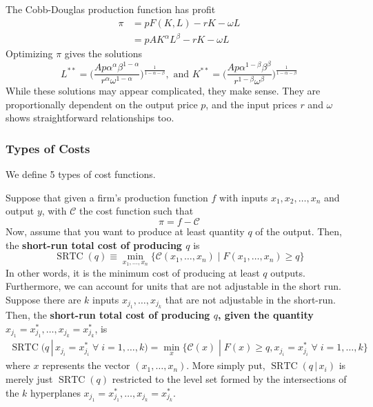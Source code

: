 \documentclass{article}
\DeclareMathOperator{\SRTC}{SRTC}
\begin{document}
      \begin{example}
        The Cobb-Douglas production function has profit
        \begin{align*}
            \pi & = p F(K, L) - r K - \omega L \\
            & = p A K^\alpha L^\beta - r K - \omega L
        \end{align*}
        Optimizing $\pi$ gives the solutions 
        \[L^{**} = \Bigg(\frac{A p \alpha^\alpha \beta^{1-\alpha}}{r^\alpha \omega^{1-\alpha}} \Bigg)^{\frac{1}{1-\alpha-\beta}}, \text{ and } K^{**} = \Bigg(\frac{A p \alpha^{1-\beta} \beta^\beta}{r^{1-\beta} \omega^\beta}\Bigg)^{\frac{1}{1-\alpha-\beta}} \]
        While these solutions may appear complicated, they make sense. They are proportionally dependent on the output price $p$, and the input prices $r$ and $\omega$ shows straightforward relationships too. 
      \end{example}

    \subsubsection{Types of Costs}

      We define 5 types of cost functions. 

      \begin{definition}
        Suppose that given a firm's production function $f$ with inputs $x_1, x_2, \ldots, x_n$ and output $y$, with $\mathcal{C}$ the cost function such that
        \[\pi = f - \mathcal{C}\]
        Now, assume that you want to produce at least quantity $q$ of the output. Then, the \textbf{short-run total cost of producing $q$} is
        \[\SRTC(q) \equiv \min_{x_1, \ldots, x_n} \{ \mathcal{C}(x_1, \ldots, x_n) \;|\; F(x_1, \ldots, x_n) \geq q\}\]
        In other words, it is the minimum cost of producing at least $q$ outputs. Furthermore, we can account for units that are not adjustable in the short run. Suppose there are $k$ inputs $x_{j_1}, \ldots, x_{j_k}$ that are not adjustable in the short-run. Then, the \textbf{short-run total cost of producing $q$, given the quantity $x_{j_1} = x_{j_1}^*, \ldots, x_{j_k} = x_{j_k}^*$}, is 
        \begin{align*}
            \SRTC(q\,|\, x_{j_i} = x_{j_i}^* \;\forall\; i = 1, \ldots, k) = \min_{x} \{ \mathcal{C}(x) \;|\; F(x) \geq q, x_{j_i} = x_{j_i}^* \;\forall\; i = 1, \ldots, k\}
        \end{align*}
        where $x$ represents the vector $(x_1, \ldots, x_n)$. 
        More simply put, $\SRTC(q\,|\, x_i)$ is merely just $\SRTC(q)$ restricted to the level set formed by the intersections of the $k$ hyperplanes $x_{j_1} = x_{j_1}^*, \ldots,  x_{j_k} = x_{j_k}^*$. 
      \end{definition}
\end{document}
